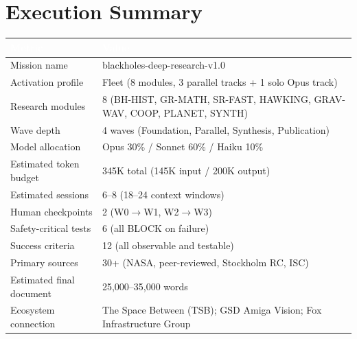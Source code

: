 \documentclass[11pt,letterpaper]{article}
\newcommand{\tableheader}[1]{\textbf{\sffamily\textcolor{white}{#1}}}
\begin{document}
\section{Execution Summary}

\begin{center}
\begin{tabularx}{\textwidth}{L{5cm}X}
\toprule
{}
\tableheader{Metric} & \tableheader{Value} \\
\midrule
Mission name & blackholes-deep-research-v1.0 \\
Activation profile & Fleet (8 modules, 3 parallel tracks + 1 solo Opus track) \\
Research modules & 8 (BH-HIST, GR-MATH, SR-FAST, HAWKING, GRAV-WAV, COOP, PLANET, SYNTH) \\
Wave depth & 4 waves (Foundation, Parallel, Synthesis, Publication) \\
Model allocation & Opus 30\% / Sonnet 60\% / Haiku 10\% \\
Estimated token budget & 345K total (145K input / 200K output) \\
Estimated sessions & 6--8 (18--24 context windows) \\
Human checkpoints & 2 (W0$\to$W1, W2$\to$W3) \\
Safety-critical tests & 6 (all BLOCK on failure) \\
Success criteria & 12 (all observable and testable) \\
Primary sources & 30+ (NASA, peer-reviewed, Stockholm RC, ISC) \\
Estimated final document & 25,000--35,000 words \\
Ecosystem connection & The Space Between (TSB); GSD Amiga Vision; Fox Infrastructure Group \\
\bottomrule
\end{tabularx}
\end{center}
\end{document}
